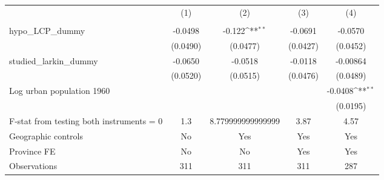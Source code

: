 {
\def\sym#1{\ifmmode^{#1}\else\(^{#1}\)\fi}
\begin{tabular}{l*{4}{c}}
\hline\hline
                &\multicolumn{1}{c}{(1)}&\multicolumn{1}{c}{(2)}&\multicolumn{1}{c}{(3)}&\multicolumn{1}{c}{(4)}\\
                &\multicolumn{1}{c}{}&\multicolumn{1}{c}{}&\multicolumn{1}{c}{}&\multicolumn{1}{c}{}\\
\hline
hypo\_LCP\_dummy  &  -0.0498         &   -0.122\sym{**} &  -0.0691         &  -0.0570         \\
                & (0.0490)         & (0.0477)         & (0.0427)         & (0.0452)         \\
[1em]
studied\_larkin\_dummy&  -0.0650         &  -0.0518         &  -0.0118         & -0.00864         \\
                & (0.0520)         & (0.0515)         & (0.0476)         & (0.0489)         \\
[1em]
Log urban population 1960&                  &                  &                  &  -0.0408\sym{**} \\
                &                  &                  &                  & (0.0195)         \\
\hline
F-stat from testing both instruments = 0&      1.3         &8.779999999999999         &     3.87         &     4.57         \\
Geographic controls&       No         &      Yes         &      Yes         &      Yes         \\
Province FE     &       No         &       No         &      Yes         &      Yes         \\
Observations    &      311         &      311         &      311         &      287         \\
\hline\hline
\end{tabular}
}
